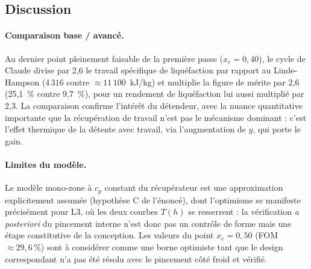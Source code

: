 


\subsection{Discussion}

\paragraph{Comparaison base / avancé.}
Au dernier point pleinement faisable de la première passe ($x_e = 0{,}40$),
le cycle de Claude divise par 2{,}6 le travail spécifique de liquéfaction par
rapport au Linde-Hampson ($4\,316$ contre $\approx 11\,100$~kJ/kg) et
multiplie la figure de mérite par 2{,}6 (25{,}1~\% contre 9{,}7~\%), pour un
rendement de liquéfaction lui aussi multiplié par 2{,}3. La comparaison
confirme l'intérêt du détendeur, avec la nuance quantitative importante que
la récupération de travail n'est pas le mécanisme dominant : c'est l'effet
thermique de la détente avec travail, via l'augmentation de $y$, qui porte
le gain.

\paragraph{Limites du modèle.}
Le modèle mono-zone à $c_p$ constant du récupérateur est une approximation
explicitement assumée (hypothèse C de l'énoncé), dont l'optimisme se
manifeste précisément pour L3, où les deux courbes $T(h)$ se resserrent :
la vérification \emph{a posteriori} du pincement interne n'est donc pas un
contrôle de forme mais une étape constitutive de la conception. Les valeurs
du point $x_e = 0{,}50$ (FOM $\approx 29{,}6\,\%$) sont à considérer comme
une borne optimiste tant que le design correspondant n'a pas été résolu avec
le pincement côté froid et vérifié.

